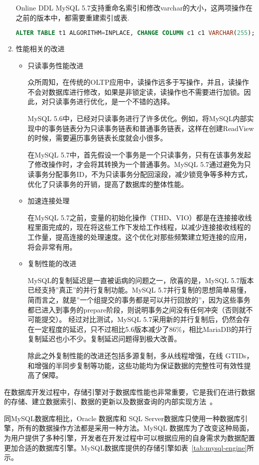 \begin{enumerate}
Online DDL MySQL 5.7支持重命名索引和修改varchar的大小，这两项操作在之前的版本中，都需要重建索引或表.
\begin{lstlisting}[language=sql,numbers=none]
ALTER TABLE t1 ALGORITHM=INPLACE, CHANGE COLUMN c1 c1 VARCHAR(255);
\end{lstlisting}

\item 性能相关的改进
\begin{itemize}
\item 只读事务性能改进

众所周知，在传统的OLTP应用中，读操作远多于写操作，并且，读操作不会对数据库进行修改，如果是非锁定读，读操作也不需要进行加锁。因此，对只读事务进行优化，是一个不错的选择。

MySQL 5.6中，已经对只读事务进行了许多优化。例如，将MySQL内部实现中的事务链表分为只读事务链表和普通事务链表，这样在创建ReadView的时候，需要遍历事务链表长度就会小很多。

在MySQL 5.7中，首先假设一个事务是一个只读事务，只有在该事务发起了修改操作时，才会将其转换为一个普通事务。MySQL 5.7通过避免为只读事务分配事务ID，不为只读事务分配回滚段，减少锁竞争等多种方式，优化了只读事务的开销，提高了数据库的整体性能。
\item 加速连接处理

在MySQL 5.7之前，变量的初始化操作（THD、VIO）都是在连接接收线程里面完成的，现在将这些工作下发给工作线程，以减少连接接收线程的工作量，提高连接的处理速度。这个优化对那些频繁建立短连接的应用，将会非常有用。
\item 复制性能的改进

MySQL的复制延迟是一直被诟病的问题之一，欣喜的是，MySQL 5.7版本已经支持”真正”的并行复制功能。MySQL 5.7并行复制的思想简单易懂，简而言之，就是”一个组提交的事务都是可以并行回放的”，因为这些事务都已进入到事务的prepare阶段，则说明事务之间没有任何冲突（否则就不可能提交）。 经过对比测试，MySQL 5.7采用新的并行复制后，仍然会存在一定程度的延迟，只不过相比5.6版本减少了86\%，相比MariaDB的并行复制延迟也小不少。复制延迟问题得到极大改善。

除此之外复制性能的改进还包括多源复制，多从线程增强，在线 GTIDs，和增强的半同步复制等功能，这些功能均为保证数据的完整性可有效性提高了保障。
\end{itemize}
\end{enumerate}

在数据库开发过程中，存储引擎对于数据库性能也非常重要，它是我们在进行数据的存储、建立数据索引、数据的更新以及数据查询的内部实现方法~\cite{胡雯2012mysql}。

同MySQL数据库相比，Oracle 数据库和 SQL Server数据库只使用一种数据库引擎，所有的数据操作方法都是采用一种方法。MySQL 数据库为了改变这种局面，为用户提供了多种引擎，开发者在开发过程中可以根据应用的自身需求为数据配置更加合适的数据库引擎。MySQL数据库提供的存储引擎如表~\ref{tab:mysql-engine}所示。

